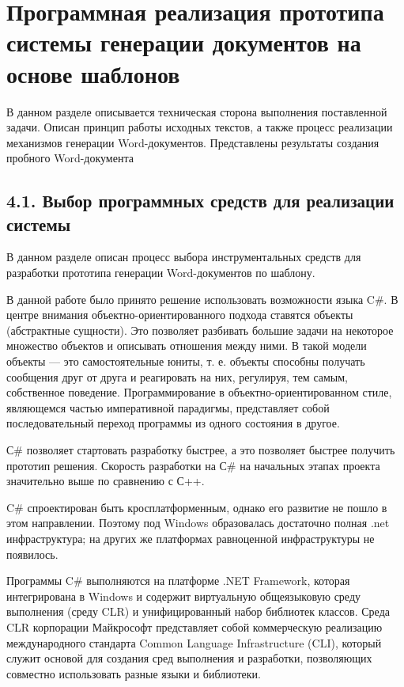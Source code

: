 \chapter{Программная реализация прототипа системы генерации документов на основе шаблонов}
\label{chapter4}

В данном разделе описывается техническая сторона выполнения поставленной задачи. Описан принцип работы исходных текстов, а также процесс реализации механизмов генерации Word-документов. Представлены результаты создания пробного Word-документа 


\section{4.1. Выбор программных средств для реализации системы}

В данном разделе описан процесс выбора инструментальных средств для разработки прототипа генерации Word-документов по шаблону.

В данной работе  было принято решение использовать возможности языка C#. В центре внимания объектно-ориентированного подхода ставятся объекты (абстрактные сущности). Это позволяет разбивать большие задачи на некоторое множество объектов и описывать отношения между ними. В такой модели объекты — это самостоятельные юниты, т. е. объекты способны получать сообщения друг от друга и реагировать на них, регулируя, тем самым, собственное поведение. Программирование в объектно-ориентированном стиле, являющемся частью императивной парадигмы, представляет собой последовательный переход программы из одного состояния в другое.

С# позволяет стартовать разработку быстрее, а это позволяет быстрее получить прототип решения. Скорость разработки на С# на начальных этапах проекта значительно выше по сравнению с С++.

C# спроектирован быть кросплатформенным, однако его развитие не пошло в этом направлении. Поэтому под Windows образовалась достаточно полная .net инфраструктура; на других же платформах равноценной инфраструктуры не появилось.

Программы C# выполняются на платформе .NET Framework, которая интегрирована в Windows и содержит виртуальную общеязыковую среду выполнения (среду CLR) и унифицированный набор библиотек классов. Среда CLR корпорации Майкрософт представляет собой коммерческую реализацию международного стандарта Common Language Infrastructure (CLI), который служит основой для создания сред выполнения и разработки, позволяющих совместно использовать разные языки и библиотеки.

